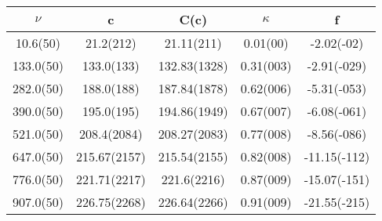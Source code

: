 \begin{table}[H]
	\centering
	\begin{tabular}{ccccc}
		$\nu$ & c & C(c) & $\kappa$ & f\\
		\hline
		10.6(50) & 21.2(212) & 21.11(211) & 0.01(00) & -2.02(-02)	\\
		133.0(50) & 133.0(133) & 132.83(1328) & 0.31(003) & -2.91(-029)	\\
		282.0(50) & 188.0(188) & 187.84(1878) & 0.62(006) & -5.31(-053)	\\
		390.0(50) & 195.0(195) & 194.86(1949) & 0.67(007) & -6.08(-061)	\\
		521.0(50) & 208.4(2084) & 208.27(2083) & 0.77(008) & -8.56(-086)	\\
		647.0(50) & 215.67(2157) & 215.54(2155) & 0.82(008) & -11.15(-112)	\\
		776.0(50) & 221.71(2217) & 221.6(2216) & 0.87(009) & -15.07(-151)	\\
		907.0(50) & 226.75(2268) & 226.64(2266) & 0.91(009) & -21.55(-215)	\\
	\end{tabular}
\end{table}